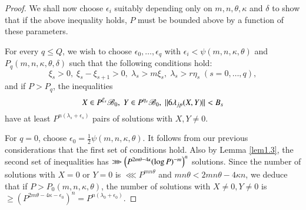 \begin{proof}
We shall now choose $\epsilon_i$ suitably depending only on 
$m,n,\theta,\kappa$ and $\delta$ to show that if the above inequality 
holds, $P$ must be bounded above by a function of these parameters.

For every $q\leq Q$, we wish to choose $\epsilon_0,\ldots, \epsilon_q$ 
with $\epsilon_i<\psi(m,n,\kappa,\theta)$ and $P_q(m,n,\kappa,\theta,\delta)$ 
such that the following conditions hold:
$$
\xi_s>0,\; \xi_s-\xi_{s+1}>0,\; \lambda_s>m\xi_s,\; \lambda_s>r\eta_s 
\;(s=0,\ldots,q),
$$
and if $P>P_q$, the inequalities 
$$
X\in P^{\xi_s}\mathscr{B}_0,\; Y\in P^{\eta_s}\mathscr{B}_0,\; ||6\lambda_{jp}(X,Y)|| 
<B_s
$$
have at least $P^{n(\lambda_s+\epsilon_s)}$ pairs of solutions with 
$X,Y\neq 0$.

For $q=0$, choose $\epsilon_0=\tfrac{1}{2}\psi(m,n,\kappa,\theta)$. It 
follows from our previous considerations that the first set of 
conditions hold. Also by Lemma \ref{lem1.3}, the second set of 
inequalities has\pageoriginale 
$\ggg \left({P^{2m\theta-4\kappa}(\log 
P)^{-m}}\right)^n$ 
solutions. Since the number of solutions with $X=0$ or 
$Y=0$ is $\lll P^{mn\theta}$ and $mn\theta<2mn\theta-4\kappa n$, we deduce 
that if $P>P_0(m,n,\kappa,\theta)$, the number of solutions with $X\neq 0, 
Y\neq 0$ is $\geq(P^{2m\theta-4\kappa-\epsilon_0})^n=P^{n(\lambda_0+
\epsilon_0)}$. 


\end{proof}
